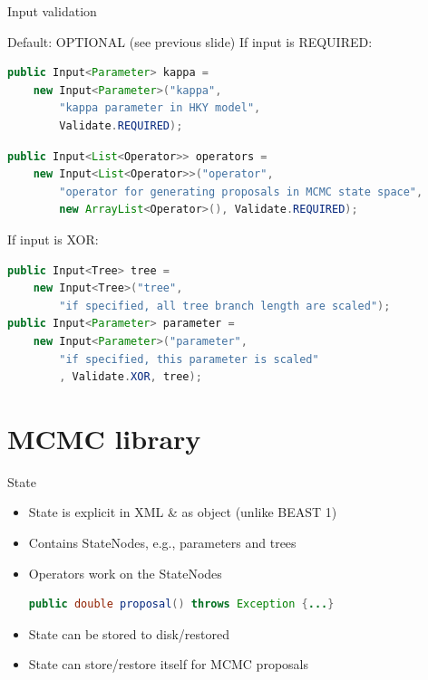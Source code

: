 \documentclass{beamer}
\theoremstyle{definition}
\begin{document}
\begin{frame}[containsverbatim]
{Input validation}

Default: OPTIONAL (see previous slide)
\vskip0.2cm
If input is REQUIRED:

\begin{lstlisting}[language=java]
public Input<Parameter> kappa = 
    new Input<Parameter>("kappa", 
        "kappa parameter in HKY model",
        Validate.REQUIRED);
\end{lstlisting}

\begin{lstlisting}[language=java]
public Input<List<Operator>> operators = 
    new Input<List<Operator>>("operator",
        "operator for generating proposals in MCMC state space",
        new ArrayList<Operator>(), Validate.REQUIRED);
\end{lstlisting}

If input is XOR:

\begin{lstlisting}[language=java]
public Input<Tree> tree = 
    new Input<Tree>("tree", 
        "if specified, all tree branch length are scaled");
public Input<Parameter> parameter = 
    new Input<Parameter>("parameter", 
        "if specified, this parameter is scaled"
        , Validate.XOR, tree);
\end{lstlisting}

\end{frame}


\section{MCMC library}


\begin{frame}[containsverbatim]
{State}
\begin{itemize}
\item State is explicit in XML \& as object (unlike BEAST 1)
\item Contains StateNodes, e.g., parameters and trees
\item Operators work on the StateNodes
\begin{lstlisting}[language=java]
public double proposal() throws Exception {...}
\end{lstlisting}
\item State can be stored to disk/restored
\item State can store/restore itself for MCMC proposals
\end{itemize}
\end{frame}
\end{document}
